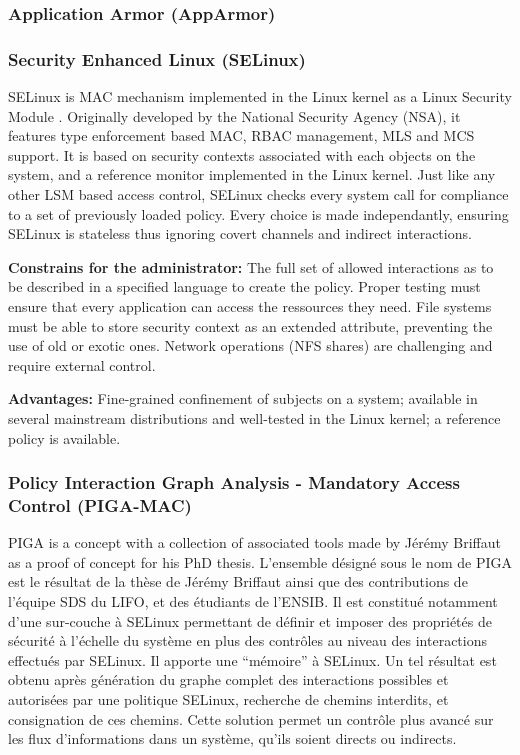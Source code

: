 \documentclass[pdftex,a4paper,titlepage,11pt]{article}
\begin{document}
\subsubsection{Application Armor (AppArmor)}
\subsubsection{Security Enhanced Linux (SELinux)}

SELinux is MAC mechanism implemented in the Linux kernel as a Linux Security
Module \cite{lsm2002linux}. Originally developed by the National Security
Agency (NSA), it features type enforcement based MAC, RBAC management, MLS and
MCS support. It is based on security contexts associated with each objects on
the system, and a reference monitor implemented in the Linux kernel. Just like
any other LSM based access control, SELinux checks every system call for
compliance to a set of previously loaded policy. Every choice is made
independantly, ensuring SELinux is stateless thus ignoring covert channels and
indirect interactions.

\begin{list}{}{}
 \item \textbf{Constrains for the administrator:} The full set of allowed
interactions as to be described in a specified language to create the policy.
Proper testing must ensure that every application can access the ressources
they need. File systems must be able to store security context as an extended
attribute, preventing the use of old or exotic ones. Network operations (NFS
shares) are challenging and require external control.
 \item \textbf{Advantages:} Fine-grained confinement of subjects on a
system; available in several mainstream distributions and well-tested in the
Linux kernel; a reference policy is available.
\end{list}

\subsubsection{Policy Interaction Graph Analysis - Mandatory Access Control
(PIGA-MAC)}

PIGA is a concept with a collection of associated tools made by Jérémy Briffaut
as a proof of concept for his PhD thesis.
L'ensemble désigné sous le nom de PIGA est le résultat de la thèse de Jérémy
Briffaut ainsi que des contributions de l'équipe SDS du LIFO, et des étudiants
de l'ENSIB. Il est constitué notamment d'une sur-couche à SELinux permettant de
définir et imposer des propriétés de sécurité à l'échelle du système en plus des
contrôles au niveau des interactions effectués par SELinux. Il apporte une
``mémoire'' à SELinux. Un tel résultat est obtenu après génération du graphe
complet des interactions possibles et autorisées par une politique SELinux,
recherche de chemins interdits, et consignation de ces chemins. Cette solution
permet un contrôle plus avancé sur les flux d'informations dans un système,
qu'ils soient directs ou indirects.
\end{document}
